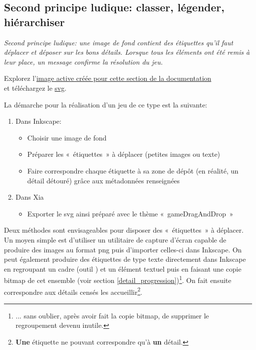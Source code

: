 {\subsection{Second principe ludique: classer, légender, hiérarchiser}

\textit{Second principe ludique: une image de fond contient des étiquettes qu'il faut déplacer et 
déposer sur les bons détails. Lorsque tous les éléments ont été remis à leur place, un message 
confirme la résolution du jeu.}

Explorez l'\href{http://geoffrey-gekiere.ac-versailles.fr/xia5}{image active créée pour cette section de la documentation} \\
et téléchargez le \href{http://geoffrey-gekiere.ac-versailles.fr/xia5/svg/xia5.svg}{svg}.

La démarche pour la réalisation d'un jeu de ce type est la suivante:
\begin{enumerate}
 \item Dans Inkscape:
\begin{itemize}
 \item Choisir une image de fond
 \item Préparer les «~étiquettes~» à déplacer (petites images ou texte)
 \item Faire correspondre chaque étiquette à sa zone de dépôt (en réalité, un détail détouré)
 grâce aux métadonnées renseignées
\end{itemize}
 \item Dans Xia
 \begin{itemize}
  \item Exporter le svg ainsi préparé avec le thème «~gameDragAndDrop~»
 \end{itemize}
\end{enumerate}

Deux méthodes sont envisageables pour disposer des «~étiquettes~» à déplacer.
Un moyen simple est d'utiliser un utilitaire de capture d'écran 
capable de produire des images au format png puis d'importer celles-ci dans Inkscape.
On peut également produire des étiquettes de type texte directement dans Inkscape en regroupant un 
cadre (outil ) et un élément textuel puis en 
faisant une copie bitmap de cet ensemble (voir section \ref{detail_progression})\footnote{... sans oublier, après avoir
fait la copie bitmap, de supprimer le regroupement devenu inutile.}.
On fait ensuite correspondre aux détails censés les accueillir\footnote{\textbf{Une} étiquette ne pouvant correspondre qu'à \textbf{un} détail.}.

}
